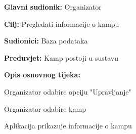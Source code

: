 					\noindent {}
					\begin{packed_item}
						
						\item \textbf{Glavni sudionik: } Organizator
						\item  \textbf{Cilj:} Pregledati informacije o kampu
						\item  \textbf{Sudionici:} Baza podataka
						\item  \textbf{Preduvjet:} Kamp postoji u sustavu
						\item  \textbf{Opis osnovnog tijeka:}
						
						\item[] \begin{packed_enum}
							
							\item Organizator odabire opciju "Upravljanje"	
							\item Organizator odabire kamp
							\item Aplikacija prikazuje informacije o kampu
						\end{packed_enum}

					\end{packed_item}
					
